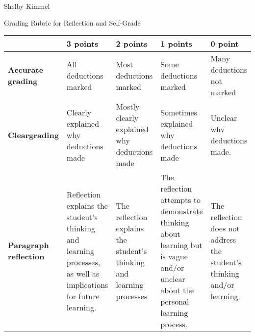 \documentclass[12pt,landscape]{article}
\begin{document}
\hfill Shelby Kimmel

\begin{center}
{\huge Grading Rubric for Reflection and Self-Grade}
\end{center}



{\renewcommand{\arraystretch}{2}
\begin{tabular}{|p{2.3cm}|p{4.2cm}|p{4.2cm}|p{4.2cm}|p{4.2cm}|}
\hline
 & {\bf 3 points} & {\bf 2 points} & {\bf 1 points} & {\bf 0 point} \\
\hline
{\bf Accurate grading }& 
 All deductions marked & 
 Most deductions marked& 
 Some deductions marked & 
 Many deductions not marked\\
\hline
{\bf Clear\newline grading }& 
Clearly explained why deductions made & 
Mostly clearly explained why deductions made & 
Sometimes explained why deductions made & 
Unclear why deductions made.\\
\hline
{\bf Paragraph reflection}&
Reflection explains the student's thinking and learning processes, as well as implications for future learning.& 
The reflection explains the student's thinking and learning processes&
The reflection attempts to demonstrate thinking about learning but is vague and/or unclear about the personal learning process.&
The reflection does not address the student's thinking and/or learning.\\
\hline
 \end{tabular}
}
\end{document}
